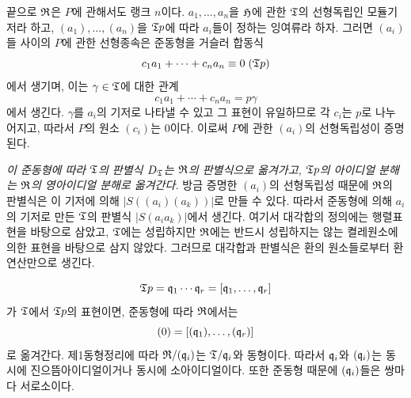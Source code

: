 끝으로 \(\mathfrak{R}\)은 \(P\)에 관해서도 랭크 \(n\)이다. \(a_1,\ldots,a_n\)을 \(\mathfrak H\)에 관한 \(\mathfrak{T}\)의 선형독립인 모듈기저라 하고, \((a_1),\ldots,(a_n)\)을 \(\mathfrak{T} p\)에 따라 \(a_i\)들이 정하는 잉여류라 하자. 그러면 \((a_i)\)들 사이의 \(P\)에 관한 선형종속은 준동형을 거슬러 합동식
\[
c_1a_1+\cdots+c_na_n\equiv0\;(\mathfrak{T} p)
\]
에서 생기며, 이는 \(\gamma\in\mathfrak{T}\)에 대한 관계
\[
c_1a_1+\cdots+c_na_n=p\gamma
\]
에서 생긴다. \(\gamma\)를 \(a_i\)의 기저로 나타낼 수 있고 그 표현이 유일하므로 각 \(c_i\)는 \(p\)로 나누어지고, 따라서 \(P\)의 원소 \((c_i)\)는 0이다. 이로써 \(P\)에 관한 \((a_i)\)의 선형독립성이 증명된다.

\emph{이 준동형에 따라 \(\mathfrak{T}\)의 판별식 \(D_{\mathfrak{T}}\)는 \(\mathfrak{R}\)의 판별식으로 옮겨가고, \(\mathfrak{T} p\)의 아이디얼 분해는 \(\mathfrak{R}\)의 영아이디얼 분해로 옮겨간다.} 방금 증명한 \((a_i)\)의 선형독립성 때문에 \(\mathfrak{R}\)의 판별식은 이 기저에 의해 \(|S((a_i)(a_k))|\)로 만들 수 있다. 따라서 준동형에 의해 \(a_i\)의 기저로 만든 \(\mathfrak{T}\)의 판별식 \(|S(a_i a_k)|\)에서 생긴다. 여기서 대각합의 정의에는 행렬표현을 바탕으로 삼았고, \(\mathfrak{T}\)에는 성립하지만 \(\mathfrak{R}\)에는 반드시 성립하지는 않는 켤레원소에 의한 표현을 바탕으로 삼지 않았다. 그러므로 대각합과 판별식은 환의 원소들로부터 환 연산만으로 생긴다.

\[
\mathfrak{T} p=\mathfrak q_1\cdots\mathfrak q_r=[\mathfrak q_1,\ldots,\mathfrak q_r]
\]
가 \(\mathfrak{T}\)에서 \(\mathfrak{T} p\)의 표현이면, 준동형에 따라 \(\mathfrak{R}\)에서는
\[
(0)=[(\mathfrak q_1),\ldots,(\mathfrak q_r)]
\]
로 옮겨간다. 제1동형정리에 따라 \(\mathfrak{R}/(\mathfrak q_i)\)는 \(\mathfrak{T}/\mathfrak q_i\)와 동형이다. 따라서 \(\mathfrak q_i\)와 \((\mathfrak q_i)\)는 동시에 진으뜸아이디얼이거나 동시에 소아이디얼이다. 또한 준동형 때문에 \((\mathfrak q_i)\)들은 쌍마다 서로소이다.


